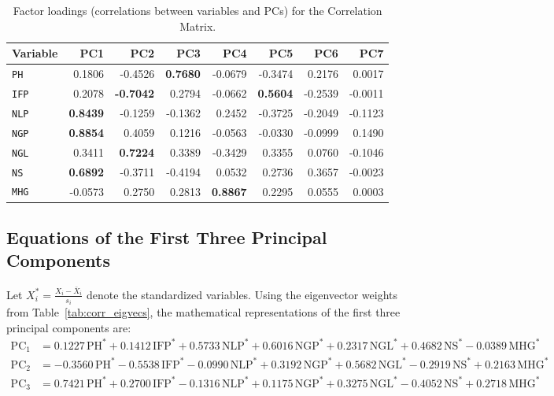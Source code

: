 \documentclass[11pt,a4paper]{article}
\begin{document}
\begin{table}[H]
\centering
\caption{Factor loadings (correlations between variables and PCs) for the Correlation Matrix.}
\label{tab:corr_loadings}
\begin{tabular}{lrrrrrrr}
\toprule
\textbf{Variable} & \textbf{PC1} & \textbf{PC2} & \textbf{PC3} & \textbf{PC4} & \textbf{PC5} & \textbf{PC6} & \textbf{PC7} \\
\midrule
\texttt{PH}  &  0.1806 & -0.4526 & \textbf{0.7680} & -0.0679 & -0.3474 &  0.2176 &  0.0017 \\
\texttt{IFP} &  0.2078 & \textbf{-0.7042} &  0.2794 & -0.0662 & \textbf{0.5604} & -0.2539 & -0.0011 \\
\texttt{NLP} & \textbf{0.8439} & -0.1259 & -0.1362 &  0.2452 & -0.3725 & -0.2049 & -0.1123 \\
\texttt{NGP} & \textbf{0.8854} &  0.4059 &  0.1216 & -0.0563 & -0.0330 & -0.0999 &  0.1490 \\
\texttt{NGL} &  0.3411 & \textbf{0.7224} &  0.3389 & -0.3429 &  0.3355 &  0.0760 & -0.1046 \\
\texttt{NS}  & \textbf{0.6892} & -0.3711 & -0.4194 &  0.0532 &  0.2736 &  0.3657 & -0.0023 \\
\texttt{MHG} & -0.0573 &  0.2750 &  0.2813 & \textbf{0.8867} &  0.2295 &  0.0555 &  0.0003 \\
\bottomrule
\end{tabular}
\end{table}

\subsection{Equations of the First Three Principal Components}

Let $X^*_i = \frac{X_i - \bar{X}_i}{s_i}$ denote the standardized variables. Using the eigenvector weights from Table~\ref{tab:corr_eigvecs}, the mathematical representations of the first three principal components are:
{\small
\begin{align}
\text{PC}_1 &= 0.1227\,\text{PH}^* + 0.1412\,\text{IFP}^* + 0.5733\,\text{NLP}^* + 0.6016\,\text{NGP}^* + 0.2317\,\text{NGL}^* + 0.4682\,\text{NS}^* - 0.0389\,\text{MHG}^* \\
\text{PC}_2 &= -0.3560\,\text{PH}^* - 0.5538\,\text{IFP}^* - 0.0990\,\text{NLP}^* + 0.3192\,\text{NGP}^* + 0.5682\,\text{NGL}^* - 0.2919\,\text{NS}^* + 0.2163\,\text{MHG}^* \\
\text{PC}_3 &= 0.7421\,\text{PH}^* + 0.2700\,\text{IFP}^* - 0.1316\,\text{NLP}^* + 0.1175\,\text{NGP}^* + 0.3275\,\text{NGL}^* - 0.4052\,\text{NS}^* + 0.2718\,\text{MHG}^*
\end{align}
}
\end{document}
